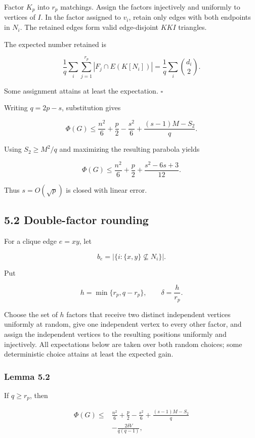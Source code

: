 \documentclass[
  11pt,
]{article}
\begin{document}
Factor \(K_p\) into \(r_p\) matchings. Assign the factors injectively
and uniformly to vertices of \(I\). In the factor assigned to \(v_i\),
retain only edges with both endpoints in \(N_i\). The retained edges
form valid edge-disjoint \(KKI\) triangles.

The expected number retained is

\[
\frac1q\sum_i\sum_{j=1}^{r_p}|F_j\cap E(K[N_i])|
=
\frac1q\sum_i\binom{d_i}{2}.
\]

Some assignment attains at least the expectation. \(\square\)

Writing \(q=2p-s\), substitution gives

\[
\Phi(G)
\le
\frac{n^2}{6}+\frac p2-\frac{s^2}{6}
+
\frac{(s-1)M-S_2}{q}.
\tag{5.2}
\]

Using \(S_2\ge M^2/q\) and maximizing the resulting parabola yields

\[
\boxed{
\Phi(G)
\le
\frac{n^2}{6}+\frac p2+\frac{s^2-6s+3}{12}.
}
\tag{5.3}
\]

Thus \(s=O(\sqrt p)\) is closed with linear error.

\subsection{5.2 Double-factor rounding}\label{double-factor-rounding}

For a clique edge \(e=xy\), let

\[
b_e=|\{i:\{x,y\}\not\subseteq N_i\}|.
\]

Put

\[
h=\min\{r_p,q-r_p\},
\qquad
\delta=\frac h{r_p}.
\]

Choose the set of \(h\) factors that receive two distinct independent
vertices uniformly at random, give one independent vertex to every other
factor, and assign the independent vertices to the resulting positions
uniformly and injectively. All expectations below are taken over both
random choices; some deterministic choice attains at least the expected
gain.

\subsubsection{Lemma 5.2}\label{lemma-5.2-double-factor-inequality}

If \(q\ge r_p\), then

\[
\boxed{
\begin{aligned}
\Phi(G)
\le{}&
\frac{n^2}{6}+\frac p2-\frac{s^2}{6}
+
\frac{(s-1)M-S_2}{q}\\
&-
\frac{2\delta V}{q(q-1)},
\end{aligned}
}
\tag{5.4}
\]
\end{document}
